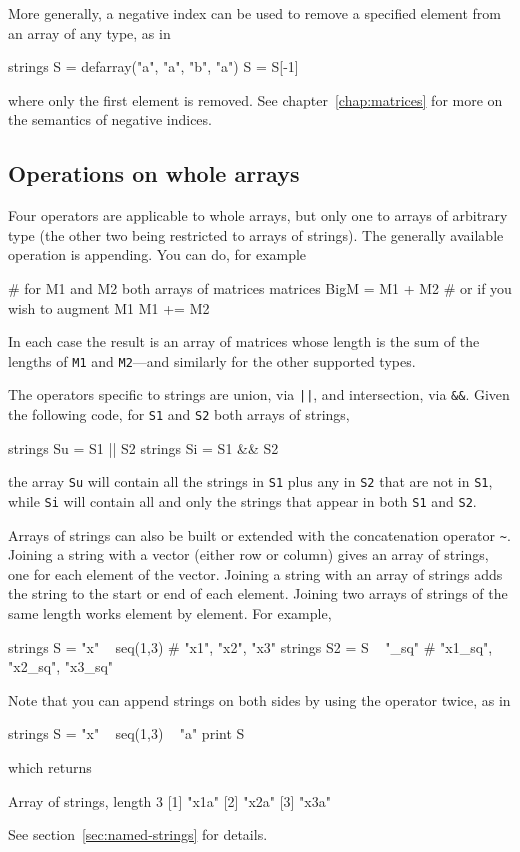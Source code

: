 More generally, a negative index can be used to remove a specified
element from an array of any type, as in
\begin{code}
strings S = defarray("a", "a", "b", "a")
S = S[-1]
\end{code}
where only the first element is removed. See
chapter~\ref{chap:matrices} for more on the semantics of negative
indices.

\subsection{Operations on whole arrays}

Four operators are applicable to whole arrays, but only one to
arrays of arbitrary type (the other two being restricted to arrays of
strings). The generally available operation is appending. You can do,
for example
\begin{code}
# for M1 and M2 both arrays of matrices
matrices BigM = M1 + M2
# or if you wish to augment M1
M1 += M2
\end{code}
In each case the result is an array of matrices whose length is the sum
of the lengths of \texttt{M1} and \texttt{M2}---and similarly for the
other supported types.

The operators specific to strings are union, via \verb+||+, and
intersection, via \verb+&&+. Given the following code, for \texttt{S1}
and \texttt{S2} both arrays of strings,
\begin{code}
strings Su = S1 || S2
strings Si = S1 && S2
\end{code}
the array \texttt{Su} will contain all the strings in \texttt{S1} plus
any in \texttt{S2} that are not in \texttt{S1}, while \texttt{Si} will
contain all and only the strings that appear in both \texttt{S1} and
\texttt{S2}.

Arrays of strings can also be built or extended with the concatenation
operator \verb|~|. Joining a string with a vector (either row or
column) gives an array of strings, one for each element of the
vector. Joining a string with an array of strings adds the string to
the start or end of each element. Joining two arrays of strings of the
same length works element by element. For example,
\begin{code}
strings S = "x" ~ seq(1,3)   # "x1", "x2", "x3"
strings S2 = S ~ "_sq"       # "x1_sq", "x2_sq", "x3_sq"
\end{code}
Note that you can append strings on both sides by using the operator
twice, as in
\begin{code}
  strings S = "x" ~ seq(1,3) ~ "a"
  print S
\end{code}
which returns
\begin{code}
  Array of strings, length 3
  [1] "x1a"
  [2] "x2a"
  [3] "x3a"
\end{code}
See section~\ref{sec:named-strings} for details.

